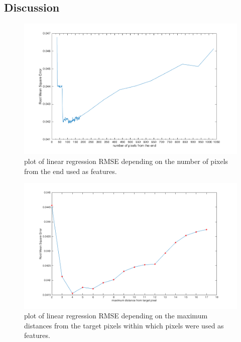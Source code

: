 \documentclass{article}
\begin{document}
		\subsection{Discussion}
		 	\begin{figure}[t]
		 		\centering
		 		\includegraphics[width=16cm]{images/p1-6_num_pixels.png}
		 		\caption{plot of linear regression RMSE depending on the number of pixels from the end  used as features.}
		 		\label{fig:p1-6_num_pixels}
		 	\end{figure}
		 	\begin{figure}[t]
		 		\centering
		 		\includegraphics[width=16cm]{images/p1-6_closest_pixels.png}
		 		\caption{plot of linear regression RMSE depending on the maximum distances from the target pixels within which pixels were  used as features.}
		 		\label{fig:p1-6_closest_pixels}	
		 	\end{figure}
\end{document}
